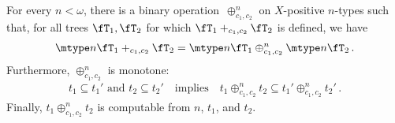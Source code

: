 \documentclass{LMCS}
\begin{document}
\begin{prop}\label{prop:Feferman-Vaught}
For every $n < \omega$,
there is a binary operation~$\oplus^n_{c_1,c_2}$ on $X$-positive $n$-types
such that,
for all trees $\fT_1,\fT_2$ for which $\fT_1 +_{c_1,c_2} \fT_2$ is defined,
we have
\begin{align*} \mtype n{\fT_1 +_{c_1,c_2} \fT_2}
    = \mtype n{\fT_1} \oplus^n_{c_1,c_2} \mtype n{\fT_2}\,.
\end{align*}
Furthermore, $\oplus^n_{c_1,c_2}$ is monotone\?:
\begin{align*}
  t_1\subseteq t_1' \text{ and } t_2 \subseteq t_2'
  \quad\text{implies}\quad
  t_1 \oplus^n_{c_1,c_2} t_2 \subseteq t_1' \oplus^n_{c_1,c_2} t_2'\,.
\end{align*}
Finally, $t_1\oplus^n_{c_1,c_2}t_2$ is computable from $n$, $t_1$, and $t_2$.
\end{prop}
\end{document}
